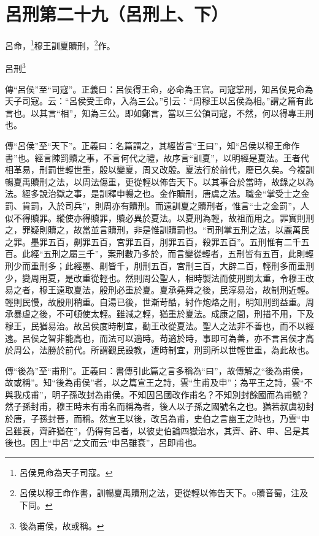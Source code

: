 \section{呂刑第二十九（呂刑上、下）}


呂命，\footnote{呂侯見命為天子司寇。}穆王訓夏贖刑，\footnote{呂侯以穆王命作書，訓暢夏禹贖刑之法，更從輕以佈告天下。○贖音蜀，注及下同。}作。

呂刑\footnote{後為甫侯，故或稱。}


{\noindent\zhuan{}\fzbyks 傳“呂侯”至“司寇”。正義曰：呂侯得王命，必命為王官。司寇掌刑，知呂侯見命為天子司寇。云：“呂侯受王命，入為三公。”引云：“周穆王以呂侯為相。”謂之篇有此言也。以其言“相”，知為三公。即如鄭言，當以三公領司寇，不然，何以得專王刑也。 \par}

{\noindent\zhuan{}\fzbyks 傳“呂侯”至“天下”。正義曰：名篇謂之，其經皆言“王曰”，知“呂侯以穆王命作書”也。經言陳罰贖之事，不言何代之禮，故序言“訓夏”，以明經是夏法。王者代相革易，刑罰世輕世重，殷以變夏，周又改殷。夏法行於前代，廢已久矣。今複訓暢夏禹贖刑之法，以周法傷重，更從輕以佈告天下。以其事合於當時，故錄之以為法。經多說治獄之事，是訓釋申暢之也。金作贖刑，唐虞之法。職金“掌受士之金罰、貨罰，入於司兵”，則周亦有贖刑。而遠訓夏之贖刑者，惟言“士之金罰”，人似不得贖罪。縱使亦得贖罪，贖必異於夏法。以夏刑為輕，故祖而用之。罪實則刑之，罪疑則贖之，故當並言贖刑，非是惟訓贖罰也。“司刑掌五刑之法，以麗萬民之罪。墨罪五百，劓罪五百，宮罪五百，刖罪五百，殺罪五百”。五刑惟有二千五百。此經“五刑之屬三千”，案刑數乃多於，而言變從輕者，五刑皆有五百，此則輕刑少而重刑多；此經墨、劓皆千，刖刑五百，宮刑三百，大辟二百，輕刑多而重刑少，變周用夏，是改重從輕也。然則周公聖人，相時製法而使刑罰太重，令穆王改易之者，穆王遠取夏法，殷刑必重於夏。夏承堯舜之後，民淳易治，故制刑近輕。輕則民慢，故殷刑稍重。自湯已後，世漸苛酷，紂作炮烙之刑，明知刑罰益重。周承暴虐之後，不可頓使太輕。雖減之輕，猶重於夏法。成康之間，刑措不用，下及穆王，民猶易治。故呂侯度時制宜，勸王改從夏法。聖人之法非不善也，而不以經遠。呂侯之智非能高也，而法可以適時。苟適於時，事即可為善，亦不言呂侯才高於周公，法勝於前代。所謂觀民設教，遭時制宜，刑罰所以世輕世重，為此故也。 \par}

{\noindent\zhuan{}\fzbyks 傳“後為”至“甫刑”。正義曰：書傳引此篇之言多稱為“曰”，故傳解之“後為甫侯，故或稱”。知“後為甫侯”者，以之篇宣王之詩，雲“生甫及申”；為平王之詩，雲“不與我戍甫”，明子孫改封為甫侯。不知因呂國改作甫名？不知別封餘國而為甫號？然子孫封甫，穆王時未有甫名而稱為者，後人以子孫之國號名之也。猶若叔虞初封於唐，子孫封晉，而稱。然宣王以後，改呂為甫，史伯之言幽王之時也，乃雲“申呂雖衰，齊許猶在”，仍得有呂者，以彼史伯論四嶽治水，其齊、許、申、呂是其後也。因上“申呂”之文而云“申呂雖衰”，呂即甫也。 \par}

